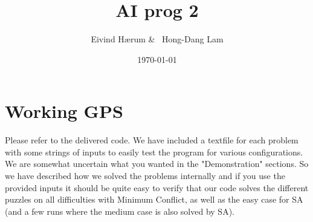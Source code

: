 \documentclass[12pt, a4paper]{article}
\title{AI prog 2}
\author{Eivind Hærum \& \ Hong-Dang Lam}
\date{\today} %
\begin{document}
\maketitle
% 
% 
 
\newpage
\tableofcontents
\newpage
 
\section{Working GPS}
Please refer to the delivered code.
We have included a textfile for each problem with some strings of inputs to easily test the program for various configurations. We are somewhat uncertain what you wanted in the "Demonstration" sections. So we have described how we solved the problems internally and if you use the provided inputs it should be quite easy to verify that our code solves the different puzzles on all difficulties with Minimum Conflict, as well as the easy case for SA (and a few runs where the medium case is also solved by SA).
\end{document}
